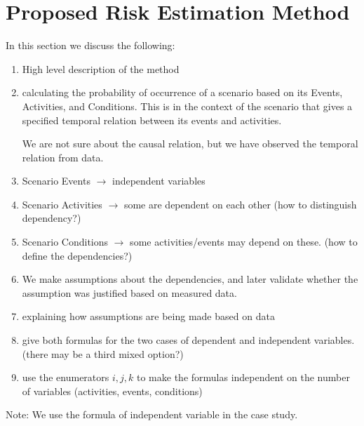 \section{Proposed Risk Estimation Method} %
\label{sec:method}

In this section we discuss the following:
\begin{enumerate}
	\item High level description of the method 
	\item calculating the probability of occurrence of a scenario based on its Events, Activities, and Conditions. This is in the context of the scenario that gives a specified temporal relation between its events and activities.
	
	We are not sure about the causal relation, but we have observed the temporal relation from data. 
	 
	\item Scenario Events $\rightarrow$ independent variables 
	\item Scenario Activities $\rightarrow$ some are dependent on each other (how to distinguish dependency?)
	\item Scenario Conditions $\rightarrow$ some activities/events may depend on these. (how to define the dependencies?)
	\item We make assumptions about the dependencies, and later validate whether the assumption was justified based on measured data. 	
	\item explaining how assumptions are being made based on data
	\item give both formulas for the two cases of dependent and independent variables. (there may be a third mixed option?)
	\item use the enumerators $i, j, k$ to make the formulas independent on the number of variables (activities, events, conditions)
\end{enumerate}

Note: We use the formula of independent variable in the case study. 





